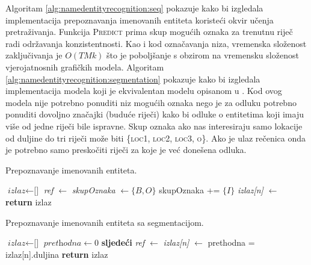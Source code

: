Algoritam \ref{alg:namedentityrecognition:seq} pokazuje kako bi izgledala
implementacija prepoznavanja imenovanih entiteta koristeći okvir učenja
pretraživanja. Funkcija \textsc{Predict} prima skup mogućih oznaka za trenutnu
riječ radi održavanja konzistentnosti. Kao i kod označavanja niza, vremenska
složenost zaključivanja je $O(T M k)$ što je poboljšanje s obzirom na vremensku
složenost vjerojatnosnih grafičkih modela. Algoritam
\ref{alg:namedentityrecognition:segmentation} pokazuje kako bi izgledala
implementacija modela koji je ekvivalentan modelu opisanom u
\citep{sarawagi2004semi}. Kod ovog modela nije potrebno ponuditi niz mogućih
oznaka nego je za odluku potrebno ponuditi dovoljno značajki (buduće riječi)
kako bi odluke o entitetima koji imaju više od jedne riječi bile ispravne. Skup
oznaka ako nas interesiraju samo lokacije od duljine do tri riječi može biti
\{\textsc{loc1}, \textsc{loc2}, \textsc{loc3}, \textsc{o}\}. Ako je ulaz
rečenica onda je potrebno samo preskočiti riječi za koje je već donešena odluka.

\begin{algorithm}[H]
\caption{Prepoznavanje imenovanih entiteta.}
\label{alg:namedentityrecognition:seq}
\begin{algorithmic}[1]
\State $\textit{izlaz} \gets \text{[]}$
  \State \textit{ref} $\gets$ 
  \State \textit{skupOznaka} $\gets \{B,O\}$
    \State skupOznaka += $\{I\}$
  \EndIf
  \State \textit{izlaz[n]} $\gets$ 
\EndFor
\State {}
\State \textbf{return} izlaz
\EndFunction
\end{algorithmic}
\end{algorithm}

\begin{algorithm}[H]
\caption{Prepoznavanje imenovanih entiteta sa segmentacijom.}
\label{alg:namedentityrecognition:segmentation}
\begin{algorithmic}[1]
\State $\textit{izlaz} \gets \text{[]}$
\State $\textit{prethodna} \gets 0$
    \State \textbf{sljedeći}
  \EndIf
  \State \textit{ref} $\gets$ 
  \State \textit{izlaz[n]} $\gets$ 
  \State prethodna = izlaz[n].duljina
\EndFor
\State {}
\State \textbf{return} izlaz
\EndFunction
\end{algorithmic}
\end{algorithm}
